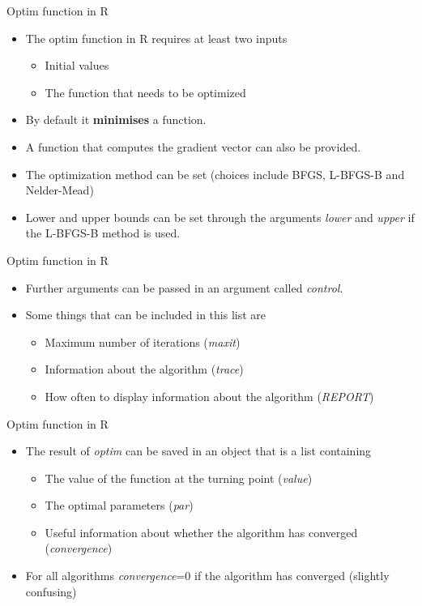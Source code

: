 \documentclass[10pt]{beamer}
\begin{document}
\begin{frame}{Optim function in R}
  \begin{itemize}
  \item The optim function in R requires at least two inputs
    \begin{itemize}
    \item Initial values
    \item The function that needs to be optimized
    \end{itemize}

  \item By default it {\bf minimises} a function.

  \item A function that computes the gradient vector can also be provided.

  \item The optimization method can be set (choices include BFGS, L-BFGS-B and Nelder-Mead)

  \item Lower and upper bounds can be set through the arguments {\em lower} and {\em upper} if the L-BFGS-B method is used.
  \end{itemize}
\end{frame}
\begin{frame}{Optim function in R}
  \begin{itemize}
  \item Further arguments can be passed in an argument called {\em control}.
  \item Some things that can be included in this list are
    \begin{itemize}
    \item Maximum number of iterations ({\em maxit})
    \item Information about the algorithm ({\em trace})
    \item How often to display information about the algorithm ({\em REPORT})
    \end{itemize}
  \end{itemize}
\end{frame}
\begin{frame}{Optim function in R}
  \begin{itemize}
  \item The result of {\em optim} can be saved in an object that is a list containing
    \begin{itemize}
    \item The value of the  function at the turning point ({\em value})
    \item The optimal parameters ({\em par})
    \item Useful information about whether the algorithm has converged ({\em convergence})
    \end{itemize}
  \item For all algorithms {\em convergence}=0 if the algorithm has converged (slightly confusing)
  \end{itemize}
\end{frame}
\end{document}
